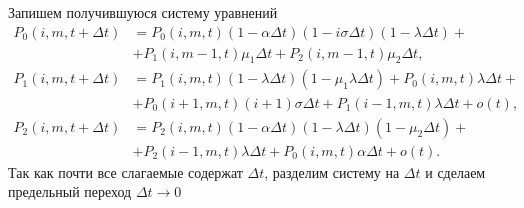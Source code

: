 Запишем получившуюся систему уравнений
\begin{equation*} 
	\begin{split}
		P_{0}(i,m,t+\Delta t)&=P_{0}(i,m,t)(1-\alpha\Delta t)(1 - i\sigma\Delta t)(1-\lambda\Delta t) +\\ &+ P_{1}(i,m-1,t)\mu_{1}\Delta t + P_{2}(i,m-1,t)\mu_{2}\Delta t,
		\\
		P_{1}(i,m,t+\Delta t)&=P_{1}(i,m,t)(1-\lambda\Delta t)(1-\mu_{1}\lambda\Delta t)+P_{0}(i,m,t)\lambda\Delta t +\\ &+ P_{0}(i+1,m,t)(i+1)\sigma\Delta t + P_{1}(i-1,m,t)\lambda\Delta t + o(t),
		\\
		P_{2}(i,m,t+\Delta t)&=P_{2}(i,m,t)(1-\alpha\Delta t)(1 - \lambda\Delta t)(1 - \mu_{2}\Delta t) +\\ &+ P_{2}(i-1,m,t)\lambda\Delta t + P_{0}(i,m,t)\alpha\Delta t + o(t).
	\end{split}
\end{equation*}
Так как почти все слагаемые содержат $\Delta t$, разделим систему на $\Delta t$ и сделаем предельный переход $\Delta t \rightarrow 0$

